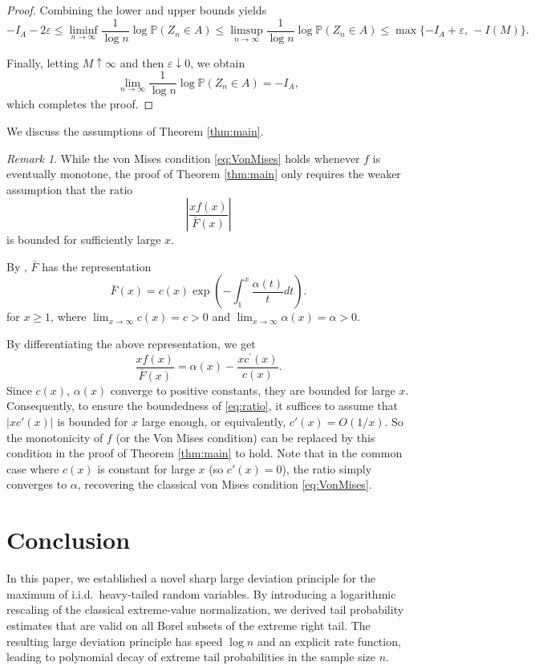 \documentclass[11pt,reqno]{amsart}
\theoremstyle{definition}
\theoremstyle{remark}
\newtheorem{remark}[theorem]{Remark}
\numberwithin{equation}{section}
\newcommand{\PP}{\mathbb{P}}
\begin{document}
\begin{proof}
Combining the lower and upper bounds yields
\[
-I_A-2\varepsilon
\le
\liminf_{n\to\infty}\frac{1}{\log n}\log\PP(Z_n\in A)
\le
\limsup_{n\to\infty}\frac{1}{\log n}\log\PP(Z_n\in A)
\le
\max\{-I_A+\varepsilon,\,-I(M)\}.
\]

Finally, letting $M\uparrow\infty$ and then $\varepsilon\downarrow0$, we obtain
\[
\lim_{n\to\infty}\frac{1}{\log n}\log\PP(Z_n\in A)
=
-I_A,
\]
which completes the proof.
\end{proof}


We discuss the assumptions of Theorem \ref{thm:main}.
\begin{remark}\label{lem:conditions}
While  the von Mises condition \eqref{eq:VonMises} holds whenever $f$ is eventually monotone, the proof of Theorem \ref{thm:main} only requires the weaker assumption that the ratio
\begin{equation}\label{eq:ratio}
\left|\frac{x f(x)}{\bar{F}(x)}\right|
\end{equation}
is bounded for sufficiently large $x$.

By \cite[Corollary 1.12]{resnick}, $\bar{F}$ has the representation
$$
\bar{F}(x)=c(x)\exp\left(-\int_ 1^x\frac{\alpha(t)}{t} dt\right).
$$ 
for $x\ge 1$, where $\lim_{x\to\infty}c(x)=c>0$ and $\lim_{x\to\infty}\alpha(x)=\alpha>0$. 

By differentiating the above representation, we get
$$
\frac{x f(x)}{\bar{F}(x)}=\alpha(x)-\frac{xc^\prime(x)}{c(x)}.
$$
Since $c(x)$, $\alpha(x)$ converge to positive constants, they are  bounded for large $x$.
 Consequently, to ensure the boundedness of \eqref{eq:ratio}, it suffices to assume that $|x c'(x)|$ is bounded for $x$ large enough, or equivalently, $c'(x) = O(1/x)$. So the monotonicity of $f$ (or the Von Mises condition) can be replaced by this condition in the proof of Theorem \ref{thm:main} to hold. Note that in the common case where $c(x)$ is constant for large $x$ (so $c'(x)=0$), the ratio simply converges to $\alpha$, recovering the classical von Mises condition \eqref{eq:VonMises}.
\end{remark}

\section{Conclusion}

In this paper, we established a novel sharp large deviation principle for the maximum
of i.i.d.\ heavy-tailed random variables. By introducing a logarithmic
rescaling of the classical extreme-value normalization, we derived tail
probability estimates that are valid on all Borel subsets of the extreme right
tail. The resulting large deviation principle has speed $\log n$ and an
explicit rate function, leading to polynomial decay of extreme tail
probabilities in the sample size $n$.
\end{document}

